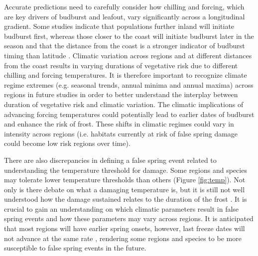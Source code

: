 \documentclass{article}\usepackage[]{graphicx}\usepackage[]{color}
\begin{document}
Accurate predictions need to carefully consider how chilling and forcing, which are key drivers of budburst and leafout, vary significantly across a longitudinal gradient. Some studies indicate that populations further inland will initiate budburst first, whereas those closer to the coast will initiate budburst later in the season and that the distance from the coast is a stronger indicator of budburst timing than latitude \citep{Myking2007}. Climatic variation across regions and at different distances from the coast results in varying durations of vegetative risk due to different chilling and forcing temperatures. It is therefore important to recognize climate regime extremes (e.g. seasonal trends, annual minima and annual maxima) across regions in future studies in order to better understand the interplay between duration of vegetative risk and climatic variation. The climatic implications of advancing forcing temperatures could potentially lead to earlier dates of budburst and enhance the risk of frost. These shifts in climatic regimes could vary in intensity across regions (i.e. habitats currently at risk of false spring damage could become low risk regions over time). 

There are also discrepancies in defining a false spring event related to understanding the temperature threshold for damage. Some regions and species may tolerate lower temperature thresholds than others (Figure \ref{fig:temp}). Not only is there debate on what a damaging temperature is, but it is still not well understood how the damage sustained relates to the duration of the frost \citep{Sakai1987, Augspurger2009, Vitasse2014, Vitra2017}. It is crucial to gain an understanding on which climatic parameters result in false spring events and how these parameters may vary across regions. It is anticipated that most regions will have earlier spring onsets, however, last freeze dates will not advance at the same rate \citep{Inouye2008,Martin2010,Labe2016}, rendering some regions and species to be more susceptible to false spring events in the future. 
\end{document}
